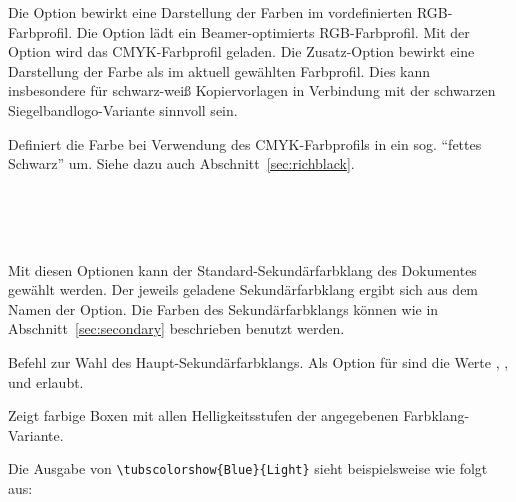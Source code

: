 Die Option  bewirkt eine Darstellung der Farben im vordefinierten
RGB-Farbprofil.
Die Option  lädt ein Beamer-optimierts RGB-Farbprofil.
Mit der Option  wird das CMYK-Farbprofil geladen.
Die Zusatz-Option  bewirkt eine Darstellung der Farbe
 als  im aktuell gewählten Farbprofil.
Dies kann insbesondere für schwarz-weiß Kopiervorlagen in Verbindung
mit der schwarzen Siegelbandlogo-Variante sinnvoll sein.


\begin{Declaration}
\end{Declaration}

Definiert die Farbe  bei Verwendung des CMYK-Farbprofils
in ein sog. "`fettes Schwarz"' um. Siehe dazu auch Abschnitt~\ref{sec:richblack}.

\begin{Declaration}
  \\
  \\
  \\
\end{Declaration}

Mit diesen Optionen kann der Standard-Sekundärfarbklang des Dokumentes gewählt
werden. Der jeweils geladene Sekundärfarbklang ergibt sich aus dem Namen
der Option.
Die Farben des Sekundärfarbklangs können wie in Abschnitt~\ref{sec:secondary}
beschrieben benutzt werden.

\begin{Declaration}
\end{Declaration}

Befehl zur Wahl des Haupt-Sekundärfarbklangs. Als Option für 
sind die Werte , ,  und 
erlaubt.

\begin{Declaration}
\end{Declaration}

Zeigt farbige Boxen mit allen Helligkeitsstufen der angegebenen Farbklang-Variante.
\begin{example}
 Die Ausgabe von \lstinline!\tubscolorshow{Blue}{Light}! sieht beispielsweise
 wie folgt aus:\\
\end{example}

\fussy



